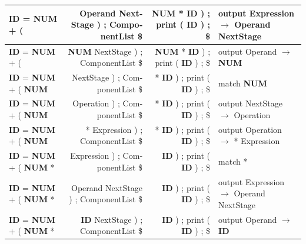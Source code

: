 \documentclass{article}
\begin{document}
\begin{latin}
\begin{table}[H]
{\begin{tabular}{|l|r|r|l|}
\textbf{ID} = \textbf{NUM} + (                                                        & Operand NextStage ) ; ComponentList \$      & \textbf{NUM} * \textbf{ID} ) ; print ( \textbf{ID} ) ; \$                                & output Expression $\longrightarrow$ Operand NextStage            \\ \hline
\textbf{ID} = \textbf{NUM} + (                                                        & \textbf{NUM} NextStage ) ; ComponentList \$ & \textbf{NUM} * \textbf{ID} ) ; print ( \textbf{ID} ) ; \$                                & output Operand $\longrightarrow$ \textbf{NUM}                    \\ \hline
\textbf{ID} = \textbf{NUM} + ( \textbf{NUM}                                           & NextStage ) ; ComponentList \$              & * \textbf{ID} ) ; print ( \textbf{ID} ) ; \$                                             & match \textbf{NUM}                                              \\ \hline
\textbf{ID} = \textbf{NUM} + ( \textbf{NUM}                                           & Operation ) ; ComponentList \$              & * \textbf{ID} ) ; print ( \textbf{ID} ) ; \$                                             & output NextStage $\longrightarrow$ Operation                     \\ \hline
\textbf{ID} = \textbf{NUM} + ( \textbf{NUM}                                           & * Expression ) ; ComponentList \$           & * \textbf{ID} ) ; print ( \textbf{ID} ) ; \$                                             & output Operation $\longrightarrow$ * Expression                  \\ \hline
\textbf{ID} = \textbf{NUM} + ( \textbf{NUM} *                                         & Expression ) ; ComponentList \$             & \textbf{ID} ) ; print ( \textbf{ID} ) ; \$                                               & match *                                                         \\ \hline
\textbf{ID} = \textbf{NUM} + ( \textbf{NUM} *                                         & Operand NextStage ) ; ComponentList \$      & \textbf{ID} ) ; print ( \textbf{ID} ) ; \$                                               & output Expression $\longrightarrow$ Operand NextStage            \\ \hline
\textbf{ID} = \textbf{NUM} + ( \textbf{NUM} *                                         & \textbf{ID} NextStage ) ; ComponentList \$  & \textbf{ID} ) ; print ( \textbf{ID} ) ; \$                                               & output Operand $\longrightarrow$ \textbf{ID}                     \\ \hline

\end{tabular}}
\end{table}
\end{latin}
\end{document}
